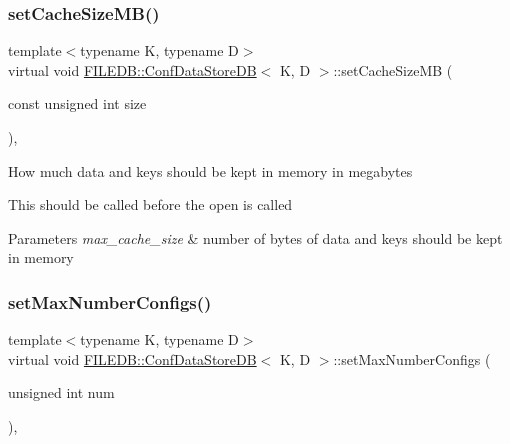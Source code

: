 \subsubsection{\texorpdfstring{setCacheSizeMB()}{setCacheSizeMB()}\hspace{0.1cm}{\footnotesize\ttfamily [3/3]}}
{\footnotesize\ttfamily template$<$typename K, typename D$>$ \\
virtual void \mbox{\hyperlink{classFILEDB_1_1ConfDataStoreDB}{F\+I\+L\+E\+D\+B\+::\+Conf\+Data\+Store\+DB}}$<$ K, D $>$\+::set\+Cache\+Size\+MB (\begin{DoxyParamCaption}\item[{const unsigned int}]{size }\end{DoxyParamCaption})\hspace{0.3cm}{\ttfamily [inline]}, {\ttfamily [virtual]}}

How much data and keys should be kept in memory in megabytes

This should be called before the open is called 
\begin{DoxyParams}{Parameters}
{\em max\+\_\+cache\+\_\+size} & number of bytes of data and keys should be kept in memory \\
\hline
\end{DoxyParams}
\mbox{\label{classFILEDB_1_1ConfDataStoreDB_acd6f44fc7a83322417ad1a7ea7d2b6ea}} 
\subsubsection{\texorpdfstring{setMaxNumberConfigs()}{setMaxNumberConfigs()}\hspace{0.1cm}{\footnotesize\ttfamily [1/3]}}
{\footnotesize\ttfamily template$<$typename K, typename D$>$ \\
virtual void \mbox{\hyperlink{classFILEDB_1_1ConfDataStoreDB}{F\+I\+L\+E\+D\+B\+::\+Conf\+Data\+Store\+DB}}$<$ K, D $>$\+::set\+Max\+Number\+Configs (\begin{DoxyParamCaption}\item[{unsigned int}]{num }\end{DoxyParamCaption})\hspace{0.3cm}{\ttfamily [inline]}, {\ttfamily [virtual]}}

